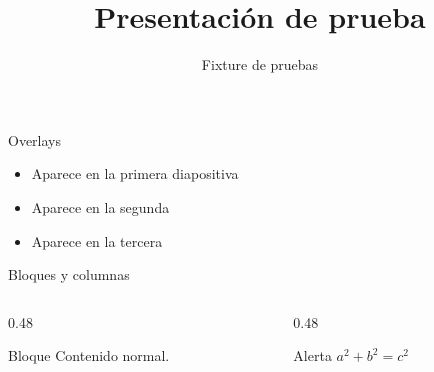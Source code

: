 \documentclass{beamer}
\title{Presentación de prueba}
\author{Fixture de pruebas}
\date{}
\begin{document}
\begin{frame}
  \titlepage
\end{frame}

\begin{frame}{Overlays}
  \begin{itemize}
    \item<1-> Aparece en la primera diapositiva
    \item<2-> Aparece en la segunda
    \item<3-> Aparece en la tercera
  \end{itemize}
\end{frame}

\begin{frame}{Bloques y columnas}
  \begin{columns}
    \begin{column}{0.48\textwidth}
      \begin{block}{Bloque}
        Contenido normal.
      \end{block}
    \end{column}
    \begin{column}{0.48\textwidth}
      \begin{alertblock}{Alerta}
        $a^2 + b^2 = c^2$
      \end{alertblock}
    \end{column}
  \end{columns}
\end{frame}
\end{document}
